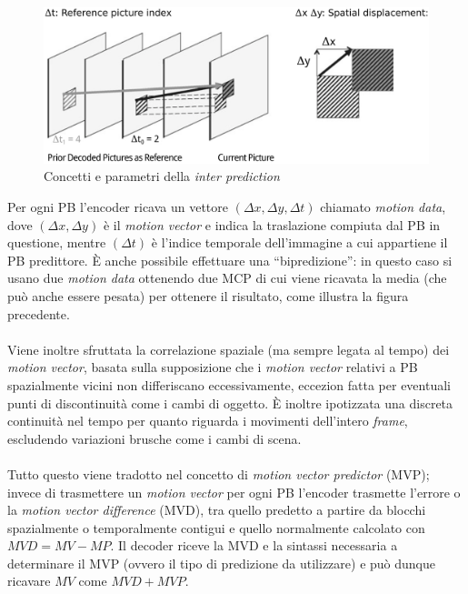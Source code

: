 \begin{figure}[H]
  \centering
  \captionsetup{justification=raggedright}
  \includegraphics[scale=0.3]{Figures/Inter_pred}
  \caption{Concetti e parametri della \emph{inter prediction}}
\end{figure}

Per ogni PB l'encoder ricava un vettore ${(\Delta x,\Delta y,\Delta t)}$ 
chiamato \emph{motion data}, dove ${(\Delta x,\Delta y)}$ è il 
\emph{motion vector} e indica la traslazione compiuta dal PB in questione, 
mentre ${(\Delta t)}$ è l'indice temporale dell'immagine a cui appartiene il PB 
predittore.
È anche possibile effettuare una ``bipredizione'': in questo caso si usano 
due \emph{motion data} ottenendo due MCP di cui viene ricavata la media (che 
può anche essere pesata) per ottenere il risultato, come illustra la figura 
precedente.
\\ \\
Viene inoltre sfruttata la correlazione spaziale (ma sempre legata al tempo) 
dei \emph{motion vector}, basata sulla supposizione che i \emph{motion vector} 
relativi a PB spazialmente vicini non differiscano eccessivamente, eccezion 
fatta per eventuali punti di discontinuità come i cambi di oggetto. È inoltre 
ipotizzata una discreta continuità nel tempo per quanto riguarda i movimenti 
dell'intero \emph{frame}, escludendo variazioni brusche come i cambi di scena.
\\ \\
Tutto questo viene tradotto nel concetto di \emph{motion vector predictor} 
(MVP); invece di trasmettere un \emph{motion vector} per ogni PB l'encoder 
trasmette l'errore o la \emph{motion vector difference} (MVD), tra quello 
predetto a partire da blocchi spazialmente o temporalmente contigui e quello 
normalmente calcolato con $MVD=MV-MP$.
Il decoder riceve la MVD e la sintassi necessaria a determinare il MVP (ovvero 
il tipo di predizione da utilizzare) e può dunque ricavare $MV$ come $MVD+MVP$.
 
